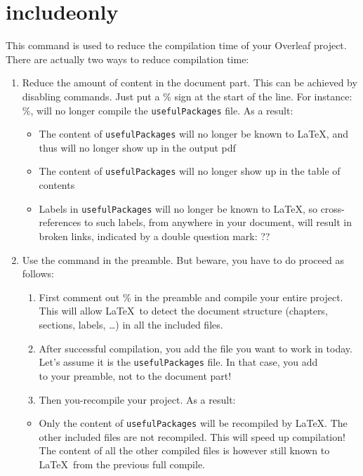 \section{includeonly}
This command is used to reduce the compilation time of your Overleaf project. There are actually two ways to reduce compilation time:
\begin{enumerate}
    \item Reduce the amount of content in the document part. This can be achieved by disabling \verb|| commands. Just put a \% sign at the start of the line. For instance: \%\verb||, will no longer compile the \verb|usefulPackages| file. As a result:
        \begin{itemize}
            \item The content of \verb|usefulPackages| will no longer be known to \LaTeX, and thus will no longer show up in the output pdf
            \item The content of \verb|usefulPackages| will no longer show up in the table of contents
            \item Labels in \verb|usefulPackages| will no longer be known to \LaTeX, so cross-references to such labels, from anywhere in your document, will result in broken links, indicated by a double question mark: ??
        \end{itemize}
    \item Use the command \verb|| in the preamble. But beware, you have to do proceed as follows:
    \begin{enumerate}
        \item First comment out \%\verb|| in the preamble and compile your entire project. This will allow \LaTeX\ to detect the document structure (chapters, sections, labels, \dots) in all the included files.
        \item After successful compilation, you add the file you want to work in today. Let's assume it is the \verb|usefulPackages| file. In that case, you add \\ \verb|| to your preamble, not to the document part!
        \item Then you-recompile your project. As a result:
    \end{enumerate}
      \begin{itemize}
            \item Only the content of \verb|usefulPackages| will be recompiled by \LaTeX. The other included files are not recompiled. This will speed up compilation! The content of all the other compiled files is however still known to \LaTeX\ from the previous full compile. 

\end{itemize}
\end{enumerate}
